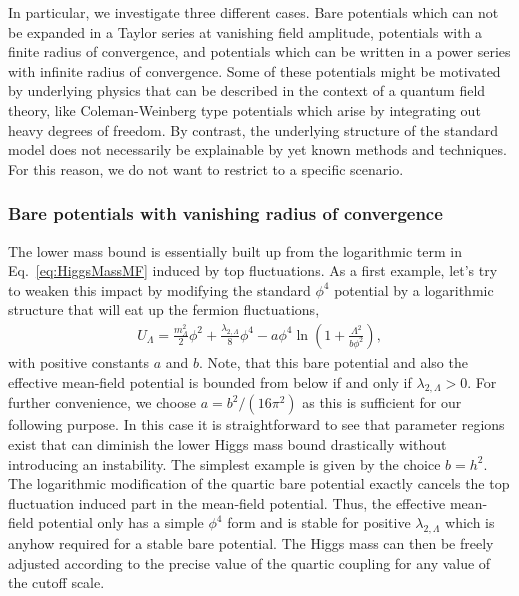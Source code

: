 \documentclass[twocolumn,aps,prd,showpacs,nofootinbib,superscriptaddress,preprintnumbers,floatfix,10pt]{revtex4-1}
\newcommand{\UL}{U_{\Lambda}}
\newcommand{\mL}{m_\Lambda^2}
\newcommand{\lL}{\lambda_{2,\Lambda}}
\begin{document}
In particular, we investigate three different cases. Bare potentials which can not be expanded in a Taylor series at vanishing field amplitude, potentials with a finite radius of convergence, and potentials which can be written in a power series with infinite radius of convergence.
Some of these potentials might be motivated by underlying physics that can be described in the context of a quantum field theory, like Coleman-Weinberg type potentials which arise by integrating out heavy degrees of freedom. By contrast, the underlying structure of the standard model does not necessarily be explainable by yet known methods and techniques. For this reason, we do not want to restrict to a specific scenario.


\subsubsection{Bare potentials with vanishing radius of convergence}
The lower mass bound is essentially built up from the logarithmic term in Eq.~\eqref{eq:HiggsMassMF} induced by top fluctuations. 
As a first example, let's try to weaken this impact by modifying the standard $\phi^{4}$ potential by a logarithmic structure that will eat up the fermion fluctuations, 
%
\begin{align}
 \UL = \frac{\mL}{2}\phi^{2} + \frac{\lL}{8}\phi^{4} - a \phi^{4} \ln \left(1+ \frac{\Lambda^{2}}{b\phi^{2}} \right),
 \label{eq:BarePotLog}
\end{align}
%
with positive constants $a$ and $b$. Note, that this bare potential and also the effective mean-field potential is bounded from below if and only if $\lL > 0$.
For further convenience, we choose $a=b^{2}/(16\pi^{2})$ as this is sufficient for our following purpose. 
In this case it is straightforward to see that parameter regions exist that can diminish the lower Higgs mass bound drastically without introducing an instability. The simplest example is given by the choice $b= h^{2}$. The logarithmic modification of the quartic bare potential exactly cancels the top fluctuation induced part in the mean-field potential. Thus, the effective mean-field potential only has a simple $\phi^{4}$ form and is stable for positive $\lL$ which is anyhow required for a stable bare potential. 
The Higgs mass can then be freely adjusted according to the precise value of the quartic coupling for any value of the cutoff scale. 
\end{document}
